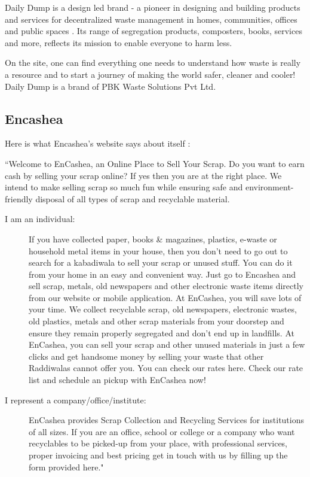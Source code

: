 \documentclass[10pt]{article}
\begin{document}
Daily Dump is a design led brand - a pioneer in designing and building products and services for decentralized waste management in homes, communities, offices and public spaces \citep{DailyDump:about}. Its range of segregation products, composters, books, services and more, reflects its mission to enable everyone to harm less.

On the site, one can find everything one needs to understand how waste is really a resource and to start a journey of making the world safer, cleaner and cooler! 
Daily Dump is a brand of PBK Waste Solutions Pvt Ltd.

\subsection{Encashea}

Here is what Encashea's website says about itself \citep{Encashea:about}:

``Welcome to EnCashea, an Online Place to Sell Your Scrap. Do you want to earn cash by selling your scrap online? If yes then you are at the right place. We intend to make selling scrap so much fun while ensuring safe and environment-friendly disposal of all types of scrap and recyclable material.

\begin{description}
\item[I am an individual:] If you have collected paper, books \& magazines, plastics, e-waste or household metal items in your house, then you don't need to go out to search for a kabadiwala to sell your scrap or unused stuff. You can do it from your home in an easy and convenient way. Just go to Encashea and sell scrap, metals, old newspapers and other electronic waste items directly from our website or mobile application.
At EnCashea, you will save lots of your time. We collect recyclable scrap, old newspapers, electronic wastes, old plastics, metals and other scrap materials from your doorstep and ensure they remain properly segregated and don't end up in landfills.
At EnCashea, you can sell your scrap and other unused materials in just a few clicks and get handsome money by selling your waste that other Raddiwalas cannot offer you. You can check our rates here.
Check our rate list and schedule an pickup with EnCashea now!
\item[I represent a company/office/institute:] EnCashea provides Scrap Collection and Recycling Services for institutions of all sizes. If you are an office, school or college or a company who want recyclables to be picked-up from your place, with professional services, proper invoicing and best pricing get in touch with us by filling up the form provided here."
\end{description}
\end{document}
